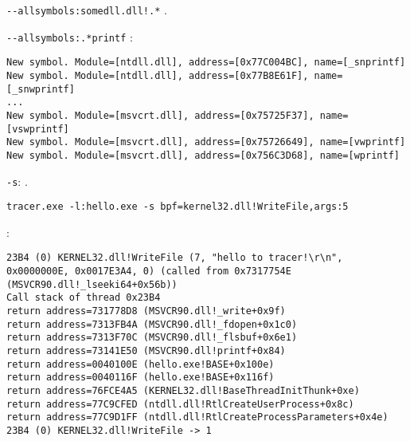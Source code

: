 \verb|--allsymbols:somedll.dll!.*| .

\verb|--allsymbols:.*printf| :

\begin{lstlisting}
New symbol. Module=[ntdll.dll], address=[0x77C004BC], name=[_snprintf]
New symbol. Module=[ntdll.dll], address=[0x77B8E61F], name=[_snwprintf]
...
New symbol. Module=[msvcrt.dll], address=[0x75725F37], name=[vswprintf]
New symbol. Module=[msvcrt.dll], address=[0x75726649], name=[vwprintf]
New symbol. Module=[msvcrt.dll], address=[0x756C3D68], name=[wprintf]
\end{lstlisting}

\verb|-s|: .

\forexample{}

\verb|tracer.exe -l:hello.exe -s bpf=kernel32.dll!WriteFile,args:5|

:

\begin{lstlisting}
23B4 (0) KERNEL32.dll!WriteFile (7, "hello to tracer!\r\n", 0x0000000E, 0x0017E3A4, 0) (called from 0x7317754E (MSVCR90.dll!_lseeki64+0x56b))
Call stack of thread 0x23B4
return address=731778D8 (MSVCR90.dll!_write+0x9f)
return address=7313FB4A (MSVCR90.dll!_fdopen+0x1c0)
return address=7313F70C (MSVCR90.dll!_flsbuf+0x6e1)
return address=73141E50 (MSVCR90.dll!printf+0x84)
return address=0040100E (hello.exe!BASE+0x100e)
return address=0040116F (hello.exe!BASE+0x116f)
return address=76FCE4A5 (KERNEL32.dll!BaseThreadInitThunk+0xe)
return address=77C9CFED (ntdll.dll!RtlCreateUserProcess+0x8c)
return address=77C9D1FF (ntdll.dll!RtlCreateProcessParameters+0x4e)
23B4 (0) KERNEL32.dll!WriteFile -> 1
\end{lstlisting}



